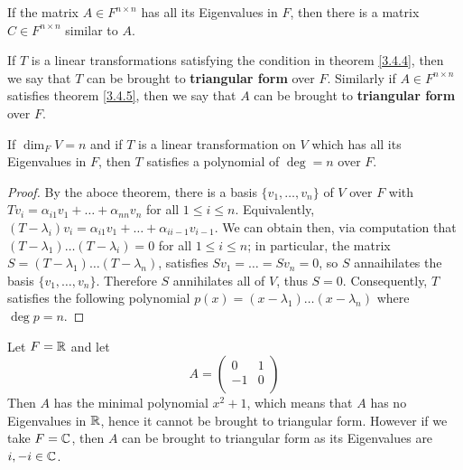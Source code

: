 \begin{theorem}\label{3.4.5}
    If the matrix $A \in F^{n \times n}$ has all its Eigenvalues in $F$, then
    there is a matrix $C \in F^{n \times n}$ similar to $A$.
\end{theorem}

\begin{definition}
    If $T$ is a linear transformations satisfying the condition in theorem
    \ref {3.4.4}, then we say that $T$ can be brought to  \textbf{triangular
    form} over $F$. Similarly if  $A \in F^{n \times n}$ satisfies theorem
    \ref{3.4.5}, then we say that $A$ can be brought to  \textbf{triangular
    form} over $F$.
\end{definition}

\begin{theorem}\label{3.4.6}
    If $\dim_F{V}=n$ and if $T$ is a linear transformation on $V$ which has all
    its Eigenvalues in  $F$, then  $T$ satisfies a polynomial of $\deg=n$ over
     $F$.
\end{theorem}
\begin{proof}
    By the aboce theorem, there is a basis $\{v_1, \dots, v_n\}$ of $V$ over
    $F$ with  $Tv_i=\alpha_{i1}v_1+\dots+\alpha_{nn}v_n$ for all $1 \leq i \leq
    n$. Equivalently,
    $(T-\lambda_i)v_i=\alpha_{i1}v_1+\dots+\alpha_{ii-1}v_{i-1}$. We can obtain
    then, via computation that $(T-\lambda_1) \dots (T-\lambda_i)=0$ for all $1
    \leq i \leq n$; in particular, the matrix  $S=(T-\lambda_1) \dots
    (T-\lambda_n)$, satisfies $Sv_1=\dots=Sv_n=0$, so $S$ annaihilates the
    basis  $\{v_1, \dots, v_n\}$. Therefore $S$ annihilates all of  $V$, thus
    $S=0$. Consequently,  $T$ satisfies the following polynomial
    $p(x)=(x-\lambda_1) \dots (x-\lambda_n)$ where $\deg{p}=n$.
\end{proof}

\begin{example}
    Let $F=\mathbb{R}$ and let
        \begin{equation*}
            A=\begin{pmatrix}
                    0   &   1   \\
                    -1  &   0   \\
              \end{pmatrix}
        \end{equation*}
    Then $A$ has the minimal polynomial  $x^2+1$, which means that  $A$ has no
    Eigenvalues in $\mathbb{R}$, hence it cannot be brought to triangular form. However
    if we take  $F=\mathbb{C}$, then  $A$ can be brought to triangular form as its
    Eigenvalues are  $i,-i \in \mathbb{C}$.
\end{example}

